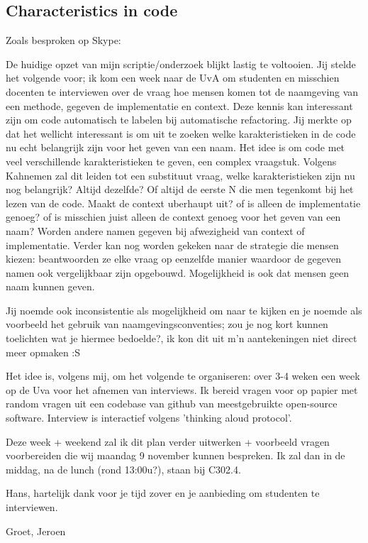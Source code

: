 \subsection{Characteristics in code}




Zoals besproken op Skype:

De huidige opzet van mijn scriptie/onderzoek blijkt lastig te voltooien. Jij stelde het volgende voor; ik kom een week naar de UvA om studenten en misschien docenten te interviewen over de vraag hoe mensen komen tot de naamgeving van een methode, gegeven de implementatie en context. Deze kennis kan interessant zijn om code automatisch te labelen bij automatische refactoring. Jij merkte op dat het wellicht interessant is om uit te zoeken welke karakteristieken in de code nu echt belangrijk zijn voor het geven van een naam. Het idee is om code met veel verschillende karakteristieken te geven, een complex vraagstuk. Volgens Kahnemen zal dit leiden tot een substituut vraag, welke karakteristieken zijn nu nog belangrijk? Altijd dezelfde? Of altijd de eerste N die men tegenkomt bij het lezen van de code. Maakt de context uberhaupt uit? of is alleen de implementatie genoeg? of is misschien juist alleen de context genoeg voor het geven van een naam? Worden andere namen gegeven bij afwezigheid van context of implementatie. Verder kan nog worden gekeken naar de strategie die mensen kiezen: beantwoorden ze elke vraag op eenzelfde manier waardoor de gegeven namen ook vergelijkbaar zijn opgebouwd. Mogelijkheid is ook dat mensen geen naam kunnen geven. 

Jij noemde ook inconsistentie als mogelijkheid om naar te kijken en je noemde als voorbeeld het gebruik van naamgevingsconventies; zou je nog kort kunnen toelichten wat je hiermee bedoelde?, ik kon dit uit m'n aantekeningen niet direct meer opmaken :S

Het idee is, volgens mij, om het volgende te organiseren: over 3-4 weken een week op de Uva voor het afnemen van interviews. Ik bereid vragen voor op papier met random vragen uit een codebase van github van meestgebruikte open-source software. Interview is interactief volgens 'thinking aloud protocol'.

Deze week + weekend zal ik dit plan verder uitwerken + voorbeeld vragen voorbereiden die wij maandag 9 november kunnen bespreken. Ik zal dan in de middag, na de lunch (rond 13:00u?), staan bij C302.4.

Hans, hartelijk dank voor je tijd zover en je aanbieding om studenten te interviewen.

Groet,
Jeroen